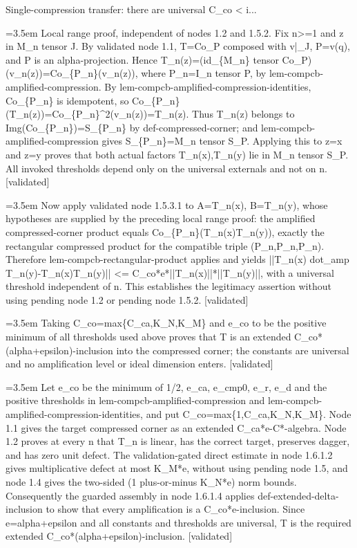 \documentclass{article}
\newcommand{\step}[1]{\par\noindent\hangindent=3.5em\hangafter=1%
  \makebox[3.5em][l]{\textbf{#1.}}}
\newcommand{\steptag}[1]{\hfill{\small\textsf{[#1]}}}
\begin{document}
\begin{proofbox}{Single-compression transfer: there are universal C\_co < i...}
\step{1.5.3.2} Local range proof, independent of nodes 1.2 and 1.5.2. Fix n>=1 and z in M\_n tensor J. By validated node 1.1, T=Co\_P composed with v|\_J, P=v(q), and P is an alpha-projection. Hence T\_n(z)=(id\_\{M\_n\} tensor Co\_P)(v\_n(z))=Co\_\{P\_n\}(v\_n(z)), where P\_n=I\_n tensor P, by lem-compcb-amplified-compression. By lem-compcb-amplified-compression-identities, Co\_\{P\_n\} is idempotent, so Co\_\{P\_n\}(T\_n(z))=Co\_\{P\_n\}\textasciicircum{}2(v\_n(z))=T\_n(z). Thus T\_n(z) belongs to Img(Co\_\{P\_n\})=S\_\{P\_n\} by def-compressed-corner; and lem-compcb-amplified-compression gives S\_\{P\_n\}=M\_n tensor S\_P. Applying this to z=x and z=y proves that both actual factors T\_n(x),T\_n(y) lie in M\_n tensor S\_P. All invoked thresholds depend only on the universal externals and not on n. \steptag{validated} \\[4pt]
\step{1.5.3.3} Now apply validated node 1.5.3.1 to A=T\_n(x), B=T\_n(y), whose hypotheses are supplied by the preceding local range proof: the amplified compressed-corner product equals Co\_\{P\_n\}(T\_n(x)T\_n(y)), exactly the rectangular compressed product for the compatible triple (P\_n,P\_n,P\_n). Therefore lem-compcb-rectangular-product applies and yields ||T\_n(x) dot\_amp T\_n(y)-T\_n(x)T\_n(y)|| <= C\_co*e*||T\_n(x)||*||T\_n(y)||, with a universal threshold independent of n. This establishes the legitimacy assertion without using pending node 1.2 or pending node 1.5.2. \steptag{validated} \\[4pt]
\step{1.6} Taking C\_co=max\{C\_ca,K\_N,K\_M\} and e\_co to be the positive minimum of all thresholds used above proves that T is an extended C\_co*(alpha+epsilon)-inclusion into the compressed corner; the constants are universal and no amplification level or ideal dimension enters. \steptag{validated} \\[6pt]
\step{1.6.1} Let e\_co be the minimum of 1/2, e\_ca, e\_cmp0, e\_r, e\_d and the positive thresholds in lem-compcb-amplified-compression and lem-compcb-amplified-compression-identities, and put C\_co=max\{1,C\_ca,K\_N,K\_M\}. Node 1.1 gives the target compressed corner as an extended C\_ca*e-C*-algebra. Node 1.2 proves at every n that T\_n is linear, has the correct target, preserves dagger, and has zero unit defect. The validation-gated direct estimate in node 1.6.1.2 gives multiplicative defect at most K\_M*e, without using pending node 1.5, and node 1.4 gives the two-sided (1 plus-or-minus K\_N*e) norm bounds. Consequently the guarded assembly in node 1.6.1.4 applies def-extended-delta-inclusion to show that every amplification is a C\_co*e-inclusion. Since e=alpha+epsilon and all constants and thresholds are universal, T is the required extended C\_co*(alpha+epsilon)-inclusion. \steptag{validated} \\[6pt]

\end{proofbox}
\end{document}
